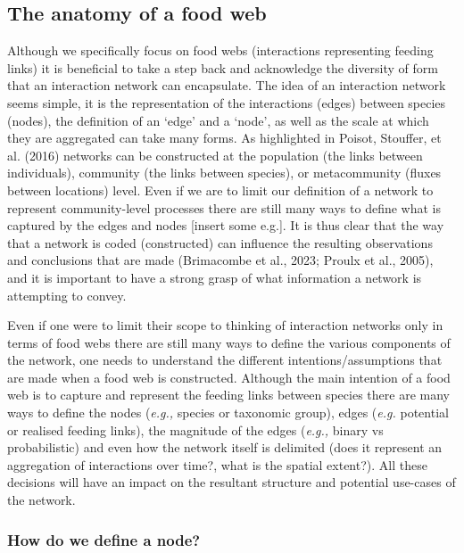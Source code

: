 \documentclass[
]{article}
\begin{document}
\subsection{The anatomy of a food web}\label{the-anatomy-of-a-food-web}

Although we specifically focus on food webs (interactions representing
feeding links) it is beneficial to take a step back and acknowledge the
diversity of form that an interaction network can encapsulate. The idea
of an interaction network seems simple, it is the representation of the
interactions (edges) between species (nodes), the definition of an
`edge' and a `node', as well as the scale at which they are aggregated
can take many forms. As highlighted in Poisot, Stouffer, et al. (2016)
networks can be constructed at the population (the links between
individuals), community (the links between species), or metacommunity
(fluxes between locations) level. Even if we are to limit our definition
of a network to represent community-level processes there are still many
ways to define what is captured by the edges and nodes {[}insert some
e.g.{]}. It is thus clear that the way that a network is coded
(constructed) can influence the resulting observations and conclusions
that are made (Brimacombe et al., 2023; Proulx et al., 2005), and it is
important to have a strong grasp of what information a network is
attempting to convey.

Even if one were to limit their scope to thinking of interaction
networks only in terms of food webs there are still many ways to define
the various components of the network, one needs to understand the
different intentions/assumptions that are made when a food web is
constructed. Although the main intention of a food web is to capture and
represent the feeding links between species there are many ways to
define the nodes (\emph{e.g.,} species or taxonomic group), edges
(\emph{e.g.} potential or realised feeding links), the magnitude of the
edges (\emph{e.g.,} binary vs probabilistic) and even how the network
itself is delimited (does it represent an aggregation of interactions
over time?, what is the spatial extent?). All these decisions will have
an impact on the resultant structure and potential use-cases of the
network.

\subsubsection{How do we define a node?}\label{how-do-we-define-a-node}
\end{document}
